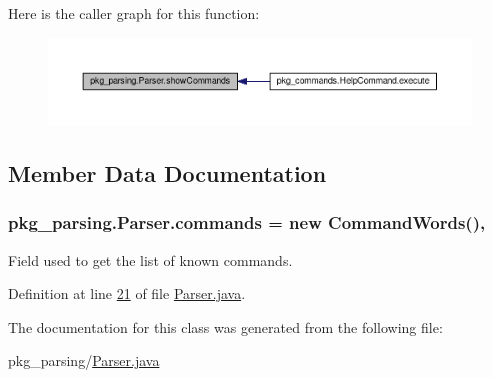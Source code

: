 Here is the caller graph for this function\-:\nopagebreak
\begin{figure}[H]
\begin{center}
\leavevmode
\includegraphics[width=350pt]{classpkg__parsing_1_1Parser_a31545cdbdb409aaeb727289c0ea7be1b_icgraph}
\end{center}
\end{figure}




\subsection{Member Data Documentation}
\hypertarget{classpkg__parsing_1_1Parser_a0e5263205b63cc2c006361a92558132a}{
\subsubsection[{commands}]{ pkg\-\_\-parsing.\-Parser.\-commands = new {\bf Command\-Words}()\hspace{0.3cm}{\ttfamily [static]}, {\ttfamily [private]}}}\label{classpkg__parsing_1_1Parser_a0e5263205b63cc2c006361a92558132a}


Field used to get the list of known commands. 



Definition at line \hyperlink{Parser_8java_source_l00021}{21} of file \hyperlink{Parser_8java_source}{Parser.\-java}.



The documentation for this class was generated from the following file\-:\begin{DoxyCompactItemize}
\item 
pkg\-\_\-parsing/\hyperlink{Parser_8java}{Parser.\-java}\end{DoxyCompactItemize}
